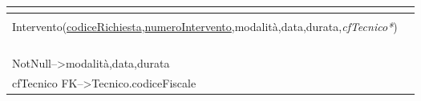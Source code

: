 \documentclass[a4paper,11pt]{report}
\begin{document}
\begin{table}[]
	
\begin{tabularx}{\textwidth}{|l|l|l|l|X}
		\hline
		\multicolumn{4}{|l|}{\cellcolor[HTML]{a3cbf8}{\color[HTML]{000000} \textbf{Intervento}}}                                                               \\ \hline
		\multicolumn{4}{|l|}{}                                                                                                                    \\
		\multicolumn{4}{|l|}{\multirow{-2}{*}{Intervento(\underline{codiceRichiesta},\underline{numeroIntervento},modalità,data,durata,\textit{cfTecnico*})}} \\                                                                       
		\multicolumn{4}{|l|}{}                                                                                                         \\
		\multicolumn{4}{|l|}{}                                                                                                         \\ 
		\multicolumn{4}{|l|}{}                                          \\
		\multicolumn{4}{|l|}{}                                          \\                         
		\multicolumn{4}{|l|}{\multirow{-6}{*}{NotNull--\textgreater modalità,data,durata}} \\
		\multicolumn{4}{|l|}{\multirow{-6}{*}{cfTecnico FK--\textgreater Tecnico.codiceFiscale}}                        \\  
	 \hline
	\end{tabularx}
\end{table}	
\end{document}
